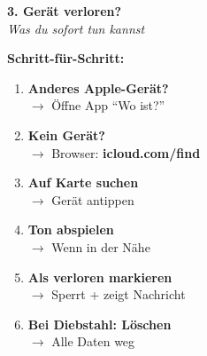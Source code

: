 \documentclass[a4paper,landscape,8pt]{extarticle}
\begin{document}
\begin{minipage}[t]{0.32\linewidth}
\begin{center}
\colorbox{warnred!15}{%
\begin{minipage}{0.95\linewidth}
\vspace{2mm}
\begin{center}
{\Large\bfseries\textcolor{warnred}{3. Gerät verloren?}}\\[1pt]
{\footnotesize\itshape Was du sofort tun kannst}
\end{center}
\vspace{2mm}
\end{minipage}%
}
\end{center}

\vspace{1mm}

\textbf{Schritt-für-Schritt:}
\begin{enumerate}
\item \textbf{Anderes Apple-Gerät?}\\
      $\rightarrow$ Öffne App ``Wo ist?''
\item \textbf{Kein Gerät?}\\
      $\rightarrow$ Browser: \textbf{icloud.com/find}
\item \textbf{Auf Karte suchen}\\
      $\rightarrow$ Gerät antippen
\item \textbf{Ton abspielen}\\
      $\rightarrow$ Wenn in der Nähe
\item \textbf{Als verloren markieren}\\
      $\rightarrow$ Sperrt + zeigt Nachricht
\item \textbf{Bei Diebstahl: Löschen}\\
      $\rightarrow$ Alle Daten weg
\end{enumerate}

\vspace{2mm}

\end{minipage}

\vspace{1mm}

\begin{center}
\end{center}
\end{document}
